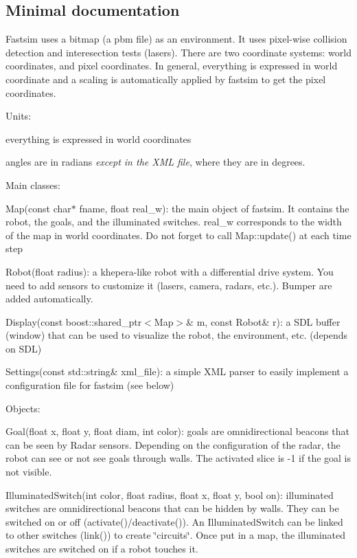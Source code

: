 \subsection*{Minimal documentation }

Fastsim uses a bitmap (a pbm file) as an environment. It uses pixel-\/wise collision detection and interesection tests (lasers). There are two coordinate systems\+: world coordinates, and pixel coordinates. In general, everything is expressed in world coordinate and a scaling is automatically applied by fastsim to get the pixel coordinates.

Units\+:
\begin{DoxyItemize}
\item everything is expressed in world coordinates
\item angles are in radians {\itshape except in the X\+ML file}, where they are in degrees.
\end{DoxyItemize}

Main classes\+:
\begin{DoxyItemize}
\item {\ttfamily Map(const char$\ast$ fname, float real\+\_\+w)}\+: the main object of fastsim. It contains the robot, the goals, and the illuminated switches. {\ttfamily real\+\_\+w} corresponds to the width of the map in world coordinates. Do not forget to call Map\+::update() at each time step
\item {\ttfamily Robot(float radius)}\+: a khepera-\/like robot with a differential drive system. You need to add sensors to customize it (lasers, camera, radars, etc.). Bumper are added automatically.
\item {\ttfamily Display(const boost\+::shared\+\_\+ptr$<$Map$>$\& m, const Robot\& r)}\+: a S\+DL buffer (window) that can be used to visualize the robot, the environment, etc. (depends on S\+DL)
\item {\ttfamily Settings(const std\+::string\& xml\+\_\+file)}\+: a simple X\+ML parser to easily implement a configuration file for fastsim (see below)
\end{DoxyItemize}

Objects\+:
\begin{DoxyItemize}
\item {\ttfamily Goal(float x, float y, float diam, int color)}\+: goals are omnidirectional beacons that can be seen by {\ttfamily Radar} sensors. Depending on the configuration of the radar, the robot can see or not see goals through walls. The activated slice is -\/1 if the goal is not visible.
\item {\ttfamily Illuminated\+Switch(int color, float radius, float x, float y, bool on)}\+: illuminated switches are omnidirectional beacons that can be hidden by walls. They can be switched on or off ({\ttfamily activate()}/{\ttfamily deactivate()}). An {\ttfamily Illuminated\+Switch} can be linked to other switches ({\ttfamily link()}) to create \char`\"{}circuits\char`\"{}. Once put in a map, the illuminated switches are switched on if a robot touches it.
\end{DoxyItemize}

